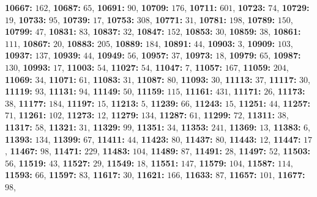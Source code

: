 \textsf{\bfseries 10667:} $162$, \textsf{\bfseries 10687:} $65$, \textsf{\bfseries 10691:} $90$, \textsf{\bfseries 10709:} $176$, \textsf{\bfseries 10711:} $601$, \textsf{\bfseries 10723:} $74$, \textsf{\bfseries 10729:} $19$, \textsf{\bfseries 10733:} $95$, \textsf{\bfseries 10739:} $17$, \textsf{\bfseries 10753:} $308$, \textsf{\bfseries 10771:} $31$, \textsf{\bfseries 10781:} $198$, \textsf{\bfseries 10789:} $150$, \textsf{\bfseries 10799:} $47$, \textsf{\bfseries 10831:} $83$, \textsf{\bfseries 10837:} $32$, \textsf{\bfseries 10847:} $152$, \textsf{\bfseries 10853:} $30$, \textsf{\bfseries 10859:} $38$, \textsf{\bfseries 10861:} $111$, \textsf{\bfseries 10867:} $20$, \textsf{\bfseries 10883:} $205$, \textsf{\bfseries 10889:} $184$, \textsf{\bfseries 10891:} $44$, \textsf{\bfseries 10903:} $3$, \textsf{\bfseries 10909:} $103$, \textsf{\bfseries 10937:} $137$, \textsf{\bfseries 10939:} $44$, \textsf{\bfseries 10949:} $56$, \textsf{\bfseries 10957:} $37$, \textsf{\bfseries 10973:} $18$, \textsf{\bfseries 10979:} $65$, \textsf{\bfseries 10987:} $130$, \textsf{\bfseries 10993:} $17$, \textsf{\bfseries 11003:} $54$, \textsf{\bfseries 11027:} $54$, \textsf{\bfseries 11047:} $7$, \textsf{\bfseries 11057:} $167$, \textsf{\bfseries 11059:} $204$, \textsf{\bfseries 11069:} $34$, \textsf{\bfseries 11071:} $61$, \textsf{\bfseries 11083:} $31$, \textsf{\bfseries 11087:} $80$, \textsf{\bfseries 11093:} $30$, \textsf{\bfseries 11113:} $37$, \textsf{\bfseries 11117:} $30$, \textsf{\bfseries 11119:} $93$, \textsf{\bfseries 11131:} $94$, \textsf{\bfseries 11149:} $50$, \textsf{\bfseries 11159:} $115$, \textsf{\bfseries 11161:} $431$, \textsf{\bfseries 11171:} $26$, \textsf{\bfseries 11173:} $38$, \textsf{\bfseries 11177:} $184$, \textsf{\bfseries 11197:} $15$, \textsf{\bfseries 11213:} $5$, \textsf{\bfseries 11239:} $66$, \textsf{\bfseries 11243:} $15$, \textsf{\bfseries 11251:} $44$, \textsf{\bfseries 11257:} $71$, \textsf{\bfseries 11261:} $102$, \textsf{\bfseries 11273:} $12$, \textsf{\bfseries 11279:} $134$, \textsf{\bfseries 11287:} $61$, \textsf{\bfseries 11299:} $72$, \textsf{\bfseries 11311:} $38$, \textsf{\bfseries 11317:} $58$, \textsf{\bfseries 11321:} $31$, \textsf{\bfseries 11329:} $99$, \textsf{\bfseries 11351:} $34$, \textsf{\bfseries 11353:} $241$, \textsf{\bfseries 11369:} $13$, \textsf{\bfseries 11383:} $6$, \textsf{\bfseries 11393:} $134$, \textsf{\bfseries 11399:} $67$, \textsf{\bfseries 11411:} $44$, \textsf{\bfseries 11423:} $80$, \textsf{\bfseries 11437:} $80$, \textsf{\bfseries 11443:} $12$, \textsf{\bfseries 11447:} $17$, \textsf{\bfseries 11467:} $98$, \textsf{\bfseries 11471:} $229$, \textsf{\bfseries 11483:} $104$, \textsf{\bfseries 11489:} $87$, \textsf{\bfseries 11491:} $28$, \textsf{\bfseries 11497:} $52$, \textsf{\bfseries 11503:} $56$, \textsf{\bfseries 11519:} $43$, \textsf{\bfseries 11527:} $29$, \textsf{\bfseries 11549:} $18$, \textsf{\bfseries 11551:} $147$, \textsf{\bfseries 11579:} $104$, \textsf{\bfseries 11587:} $114$, \textsf{\bfseries 11593:} $66$, \textsf{\bfseries 11597:} $83$, \textsf{\bfseries 11617:} $30$, \textsf{\bfseries 11621:} $166$, \textsf{\bfseries 11633:} $87$, \textsf{\bfseries 11657:} $101$, \textsf{\bfseries 11677:} $98$, 
